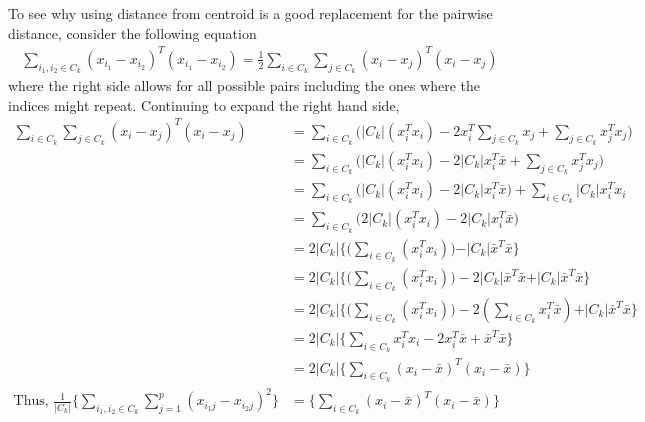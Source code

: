 \documentclass[../statistical_learning_notes.tex]{subfiles}
\begin{document}
    To see why using distance from centroid is a good replacement for the pairwise distance, consider the following equation
    \begin{align*}
        \sum_{i_{1}, i_{2} \in C_{k}} (x_{i_{1}} - x_{i_{2}})^{T} (x_{i_{1}} - x_{i_{2}}) = \frac{1}{2} \sum_{i \in C_{k}} \sum_{j \in C_{k}} (x_{i} - x_{j})^{T}(x_{i} - x_{j})
    \end{align*}
    where the right side allows for all possible pairs including the ones where the indices might repeat. Continuing to expand the right hand side,
    \begin{align*}
        \sum_{i \in C_{k}} \sum_{j \in C_{k}} (x_{i} - x_{j})^{T}(x_{i} - x_{j}) &= \sum_{i \in C_{k}} \bigg(\vert C_{k} \vert (x_{i}^{T} x_{i}) - 2x_{i}^{T} \sum_{j \in C_{k}} x_{j} + \sum_{j \in C_{k}} x_{j}^{T} x_{j} \bigg)\\
        &= \sum_{i \in C_{k}} \bigg( \vert C_{k} \vert (x_{i}^{T} x_{i}) - 2\vert C_{k} \vert x_{i}^{T} \bar{x} + \sum_{j \in C_{k}} x_{j}^{T} x_{j} \bigg)\\
        &= \sum_{i \in C_{k}} \bigg( \vert C_{k} \vert (x_{i}^{T} x_{i}) - 2\vert C_{k} \vert x_{i}^{T} \bar{x} \bigg) + \sum_{i \in C_{k}} \vert C_{k} \vert x_{i}^{T} x_{i}\\
        &= \sum_{i \in C_{k}} \bigg( 2\vert C_{k} \vert (x_{i}^{T} x_{i}) - 2\vert C_{k} \vert x_{i}^{T} \bar{x} \bigg)\\
        &= 2 \vert C_{k} \vert \bigg\{ \bigg( \sum_{i \in C_{k}}  (x_{i}^{T} x_{i}) \bigg) - \vert C_{k} \vert \bar{x}^{T} \bar{x} \bigg\}\\
        &= 2 \vert C_{k} \vert \bigg\{ \bigg( \sum_{i \in C_{k}}  (x_{i}^{T} x_{i}) \bigg) - 2\vert C_{k} \vert \bar{x}^{T} \bar{x} + \vert C_{k} \vert \bar{x}^{T} \bar{x} \bigg\}\\
        &= 2 \vert C_{k} \vert \bigg\{ \bigg( \sum_{i \in C_{k}}  (x_{i}^{T} x_{i}) \bigg) - 2 (\sum_{i \in C_{k}} x_{i}^{T} \bar{x}) + \vert C_{k} \vert \bar{x}^{T} \bar{x} \bigg\}\\
        &= 2 \vert C_{k} \vert \bigg\{ \sum_{i \in C_{k}}  x_{i}^{T} x_{i} - 2 x_{i}^{T} \bar{x} + \bar{x}^{T} \bar{x} \bigg\}\\
        &= 2 \vert C_{k} \vert \bigg\{ \sum_{i \in C_{k}}  (x_{i} - \bar{x})^{T} (x_{i} - \bar{x}) \bigg\}\\
        \text{Thus, } \frac{1}{\vert C_{k} \vert} \bigg\{\sum_{i_{1}, i_{2} \in C_{k}} \sum_{j=1}^{p} (x_{i_{1}j} - x_{i_{2}j})^{2} \bigg \} &= \bigg\{ \sum_{i \in C_{k}}  (x_{i} - \bar{x})^{T} (x_{i} - \bar{x}) \bigg\}
    \end{align*}
\end{document}
